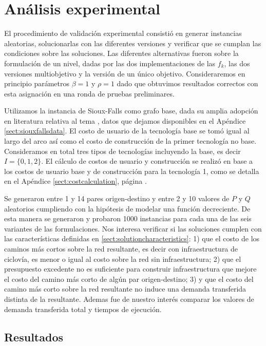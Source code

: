 \FloatBarrier
\section{Análisis experimental}

El procedimiento de validación experimental consistió en generar instancias aleatorias, solucionarlas con las diferentes versiones y verificar que se cumplan las condiciones sobre las soluciones. Las diferentes alternativas fueron sobre la formulación de un nivel, dadas por las dos implementaciones de las $f_k$, las dos versiones multiobjetivo y la versión de un único objetivo. Consideraremos en principio parámetros $\beta = 1$ y $\rho = 1$ dado que obtuvimos resultados correctos con esta asignación en una ronda de pruebas preliminares.

Utilizamos la instancia de Sioux-Falls como grafo base, dada su amplia adopción en literatura relativa al tema \parencite{Liu2019}, datos que dejamos disponibles en el Apéndice \ref{sect:siouxfallsdata}. El costo de usuario de la tecnología base se tomó igual al largo del arco así como el costo de construcción de la primer tecnología no base. Consideramos en total tres tipos de tecnologías incluyendo la base, es decir $I = \{0, 1, 2\}$. El cálculo de costos de usuario y construcción se realizó en base a los costos de usuario base y de construcción para la tecnología 1, como se detalla en el Apéndice \ref{sect:costcalculation}, página \pageref{sect:costcalculation}.

Se generaron entre 1 y 14 pares origen-destino y entre 2 y 10 valores de $P$ y $Q$ aleatorios cumpliendo con la hipótesis de modelar una función decreciente.
De esta manera se generaron y probaron 1000 instancias para cada una de las seis variantes de las formulaciones. Nos interesa verificar si las soluciones cumplen con las características definidas en \ref{sect:solutioncharacteristics}: 1) que el costo de los caminos más cortos sobre la red resultante, es decir con infraestructura de ciclovía, es menor o igual al costo sobre la red sin infraestructura; 2) que el presupuesto excedente no es suficiente para construir infraestructura que mejore el costo del camino más corto de algún par origen-destino; 3) y que el costo del camino más corto sobre la red resultante no induce una demanda transferida distinta de la resultante. Ademas fue de nuestro interés comparar los valores de demanda transferida total y tiempos de ejecución.

\FloatBarrier
\subsection{Resultados}


